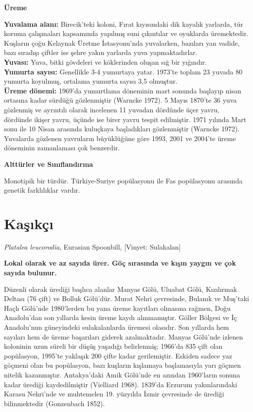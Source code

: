 \documentclass[
  letterpaper,
  DIV=11,
  numbers=noendperiod]{scrreprt}
\begin{document}
\textbf{Üreme}

\textbf{Yuvalama alanı:} Birecik'teki koloni, Fırat kıyısındaki dik
kayalık yarlarda, tür koruma çalışmaları kapsamında yapılmış suni
çıkıntılar ve oyuklarda üremektedir. Kuşların çoğu Kelaynak Üretme
İstasyonu'nda yuvalarken, bazıları yan vadide, bazı sıradışı çiftler ise
şehre yakın yarlarda yuva yapmaktadırlar.\\
\textbf{Yuvası:} Yuva, bitki gövdeleri ve köklerinden oluşan sığ bir
yığındır.\\
\textbf{Yumurta sayısı:} Genellikle 3-4 yumurtaya yatar. 1973'te toplam
23 yuvada 80 yumurta koyulmuş, ortalama yumurta sayısı 3,5 olmuştur.\\
\textbf{Üreme dönemi:} 1969'da yumurtlama döneminin mart sonunda
başlayıp nisan ortasına kadar sürdüğü gözlenmiştir (Warncke 1972). 5
Mayıs 1870'te 36 yuva gözlenmiş ve ayrıntılı olarak incelenen 11 yuvadan
dördünde üçer yavru, dördünde ikişer yavru, üçünde ise birer yavru
tespit edilmiştir. 1971 yılında Mart sonu ile 10 Nisan arasında
kuluçkaya başladıkları gözlenmiştir (Warncke 1972). Yuvalarda gözlenen
yavruların büyüklüğüne göre 1993, 2001 ve 2004'te üreme döneminin
zamanlaması çok benzerdir.

\textbf{Alttürler ve Sınıflandırma}

Monotipik bir türdür. Türkiye-Suriye popülasyonu ile Fas popülasyonu
arasında genetik farklılıklar vardır.

\section{Kaşıkçı}\label{kaux15fux131kuxe7ux131}

\emph{Platalea leucorodia}, Eurasian Spoonbill, {[}Vinyet: Sulakalan{]}

\textbf{Lokal olarak ve az sayıda ürer. Göç sırasında ve kışın yaygın ve
çok sayıda bulunur.}

Düzenli olarak ürediği başlıca alanlar Manyas Gölü, Uluabat Gölü,
Kızılırmak Deltası (76 çift) ve Bolluk Gölü'dür. Murat Nehri çevresinde,
Bulanık ve Muş'taki Haçlı Gölü'nde 1980'lerden bu yana üreme kayıtları
olmasına rağmen, Doğu Anadolu'dan son yıllarda kesin üreme kaydı
alınmamıştır. Göller Bölgesi ve İç Anadolu'nun güneyindeki
sulakalanlarda üremesi olasıdır. Son yıllarda hem sayıları hem de üreme
başarıları giderek azalmaktadır. Manyas Gölü'nde izlenen koloninin uzun
süreli bir düşüş yaşadığı belirlenmiş; 1966'da 835 çift olan popülasyon,
1995'te yaklaşık 200 çifte kadar gerilemiştir. Eskiden sadece yaz
göçmeni olan bu popülasyon, bazı kuşların kışlamaya başlamasıyla yarı
göçmen nitelik kazanmıştır. Antakya'daki Amik Gölü'nde en azından
1960'ların sonuna kadar ürediği kaydedilmiştir (Vielliard 1968). 1839'da
Erzurum yakınlarındaki Karasu Nehri'nde ve muhtemelen 19. yüzyılda İzmir
çevresinde de ürediği bilinmektedir (Gonzenbach 1852).
\end{document}
